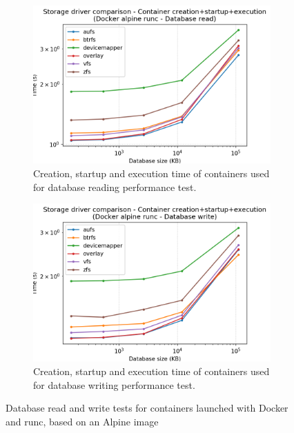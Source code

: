 \begin{figure}[h!]
    \begin{subfigure}{.5\textwidth}
      \centering
      \includegraphics[width=\linewidth]{images/storage-driver/storage-driver-full-Docker-alpine-runc---Database-read.png}
      \caption{Creation, startup and execution time of containers used for database reading performance test.}
      \label{fig:storage-driver:runc:db-read-full}
    \end{subfigure}
    \begin{subfigure}{.5\textwidth}
      \centering
      \includegraphics[width=\linewidth]{images/storage-driver/storage-driver-full-Docker-alpine-runc---Database-write.png}
      \caption{Creation, startup and execution time of containers used for database writing performance test.}
      \label{fig:storage-driver:runc:db-write-full}
    \end{subfigure}
    
    \caption{Database read and write tests for containers launched with Docker and runc, based on an Alpine image}
\end{figure}

